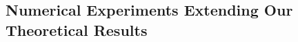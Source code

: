 \documentclass[10pt]{article}
\begin{document}



\subsection*{Numerical Experiments Extending Our Theoretical Results}



\end{document}
